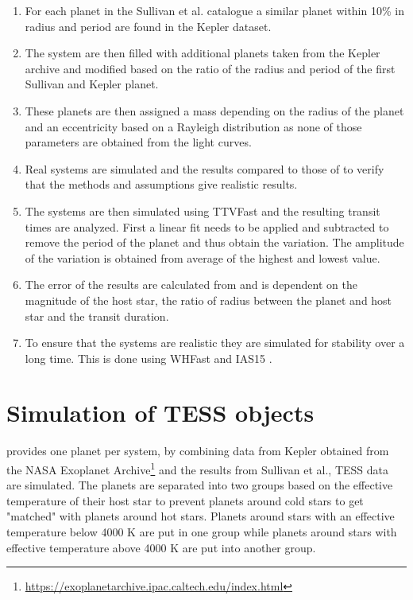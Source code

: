 \documentclass[12pt]{report}
\begin{document}
\begin{enumerate}
	\item For each planet in the Sullivan et al. catalogue a similar planet within 10\% in radius and period are found in the Kepler dataset.
	\item The system are then filled with additional planets taken from the Kepler archive and modified based on the ratio of the radius and period of the first Sullivan and Kepler planet.
	\item These planets are then assigned a mass depending on the radius of the planet \citep{2015ApJ...809...77S} and an eccentricity based on a Rayleigh distribution as none of those parameters are obtained from the light curves.
	\item Real systems are simulated and the results compared to those of \cite{2018ApJS..234....9O} to verify that the methods and assumptions give realistic results.
	\item The systems are then simulated using TTVFast \citep{2014ApJ...787..132D} and the resulting transit times are analyzed. First a linear fit needs to be applied and subtracted to remove the period of the planet and thus obtain the variation. The amplitude of the variation is obtained from average of the highest and lowest value.
	\item The error of the results are calculated from \cite{2005Sci...307.1288H} and is dependent on the magnitude of the host star, the ratio of radius between the planet and host star and the transit duration.
	\item To ensure that the systems are realistic they are simulated for stability over a long time. This is done using WHFast \citep{2015MNRAS.452..376R} and IAS15 \citep{2015MNRAS.446.1424R}.
\end{enumerate}

\section{Simulation of TESS objects}
\label{simTESS}
	\cite{2015ApJ...809...77S} provides one planet per system, by combining data from Kepler obtained from the NASA Exoplanet Archive\footnote{\url{https://exoplanetarchive.ipac.caltech.edu/index.html}} and the results from Sullivan et al., TESS data are simulated. The planets are separated into two groups based on the effective temperature of their host star to prevent planets around cold stars to get "matched" with planets around hot stars. Planets around stars with an effective temperature below 4000 K are put in one group while planets around stars with effective temperature above 4000 K are put into another group.
	
\end{document}
